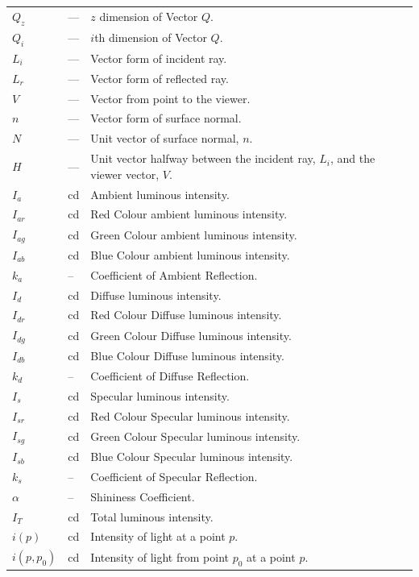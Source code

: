 \documentclass[12pt]{article}
\begin{document}
\begin{longtable*}{l l p{12cm}}
	\\
	$Q_{z}$ & --- & $z$ dimension of Vector $Q$.
	\\
	$Q_{i}$ & --- & $i$th dimension of Vector $Q$.
	\\
	$L_{i}$ & --- & Vector form of incident ray.
	\\
	$L_{r}$ & --- & Vector form of reflected ray.
	\\
	$V$ & --- & Vector from point to the viewer.
	\\
	$n$ & --- & Vector form of surface normal.
	\\
	$N$ & --- & Unit vector of surface normal, $n$.
	\\
	$H$ & --- & Unit vector halfway between the incident ray, $L_{i}$, and
	the viewer vector, $V$.
	\\
	$I_{a}$ & cd & Ambient luminous intensity.
	\\
	$I_{ar}$ & cd & Red Colour ambient luminous intensity.
	\\
	$I_{ag}$ & cd & Green Colour ambient luminous intensity.
	\\
	$I_{ab}$ & cd & Blue Colour ambient luminous intensity.
	\\
	$k_{a}$ & -- & Coefficient of Ambient Reflection.
	\\
	$I_{d}$ & cd & Diffuse luminous intensity.
	\\
	$I_{dr}$ & cd & Red Colour Diffuse luminous intensity.
	\\
	$I_{dg}$ & cd & Green Colour Diffuse luminous intensity.
	\\
	$I_{db}$ & cd & Blue Colour Diffuse luminous intensity.
	\\
	$k_{d}$ & -- & Coefficient of Diffuse Reflection.
	\\
	$I_{s}$ & cd & Specular luminous intensity.
	\\
	$I_{sr}$ & cd & Red Colour Specular luminous intensity.
	\\
	$I_{sg}$ & cd & Green Colour Specular luminous intensity.
	\\
	$I_{sb}$ & cd & Blue Colour Specular luminous intensity.
	\\
	$k_{s}$ & -- & Coefficient of Specular Reflection.
	\\
	$\alpha$ & -- & Shininess Coefficient.
	\\
	$I_{T}$ & cd & Total luminous intensity.
	\\
	$i(p)$ & cd & Intensity of light at a point $p$.
	\\
	$i(p, p_{0})$ & cd & Intensity of light from point $p_{0}$ at a point $p$.
	\\
	\bottomrule
\end{longtable*}
\end{document}
